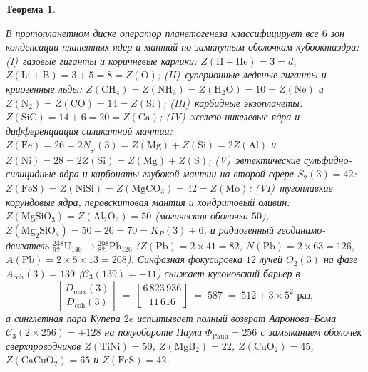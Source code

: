\documentclass[11pt,a4paper]{article}
\theoremstyle{plain}
\newtheorem{theorem}{Теорема}[section]
\theoremstyle{definition}
\begin{document}
\begin{theorem}
\begin{enumerate}[label=\textbf{(\arabic*)},leftmargin=*]
  В протопланетном диске оператор планетогенеза классифицирует все $6$ зон конденсации планетных ядер и мантий по замкнутым оболочкам кубооктаэдра: (I)~газовые гиганты и коричневые карлики: $Z(\mathrm{H+He}) = 3 = d$, $Z(\mathrm{Li+B}) = 3 + 5 = 8 = Z(\mathrm{O})$; (II)~суперионные ледяные гиганты и криогенные льды: $Z(\mathrm{CH_4}) = Z(\mathrm{NH_3}) = Z(\mathrm{H_2O}) = 10 = Z(\mathrm{Ne})$ и $Z(\mathrm{N_2}) = Z(\mathrm{CO}) = 14 = Z(\mathrm{Si})$; (III)~карбидные экзопланеты: $Z(\mathrm{SiC}) = 14 + 6 = 20 = Z(\mathrm{Ca})$; (IV)~железо-никелевые ядра и дифференциация силикатной мантии: $Z(\mathrm{Fe}) = 26 = 2 N_\varphi(3) = Z(\mathrm{Mg}) + Z(\mathrm{Si}) = 2 Z(\mathrm{Al})$ и $Z(\mathrm{Ni}) = 28 = 2 Z(\mathrm{Si}) = Z(\mathrm{Mg}) + Z(\mathrm{S})$; (V)~эвтектические сульфидно-силицидные ядра и карбонаты глубокой мантии на второй сфере $S_2(3) = 42$: $Z(\mathrm{FeS}) = Z(\mathrm{NiSi}) = Z(\mathrm{MgCO_3}) = 42 = Z(\mathrm{Mo})$; (VI)~тугоплавкие корундовые ядра, перовскитовая мантия и хондритовый оливин: $Z(\mathrm{MgSiO_3}) = Z(\mathrm{Al_2O_3}) = 50$ (магическая оболочка $50$), $Z(\mathrm{Mg_2SiO_4}) = 50 + 20 = 70 = K_P(3) + 6$, и радиогенный геодинамо-двигатель $^{238}_{92}\mathrm{U}_{146} \to {}^{208}_{82}\mathrm{Pb}_{126}$ ($Z(\mathrm{Pb}) = 2\times 41 = 82$, $N(\mathrm{Pb}) = 2\times 63 = 126$, $A(\mathrm{Pb}) = 2\times 8\times 13 = 208$). Синфазная фокусировка $12$ лучей $O_2(3)$ на фазе $A_{\mathrm{coh}}(3) = 139$ ($\mathcal{C}_3(139) = -11$) снижает кулоновский барьер в
  \begin{equation}
    \label{eq:barrier-collapse-587}
    \left\lfloor\frac{D_{\max}(3)}{D_{\mathrm{coh}}(3)}\right\rfloor \;=\; \left\lfloor\frac{6\,823\,936}{11\,616}\right\rfloor \;=\; 587 \;=\; 512 + 3\times 5^2 \text{ раз,}
  \end{equation}
  а синглетная пара Купера $2e$ испытывает полный возврат Ааронова--Бома $\mathcal{C}_3(2\times 256) = +128$ на полуобороте Паули $\Phi_{\mathrm{Pauli}} = 256$ с замыканием оболочек сверхпроводников $Z(\mathrm{TiNi}) = 50$, $Z(\mathrm{MgB_2}) = 22$, $Z(\mathrm{CuO_2}) = 45$, $Z(\mathrm{CaCuO_2}) = 65$ и $Z(\mathrm{FeS}) = 42$.


\end{enumerate}
\end{theorem}
\end{document}
